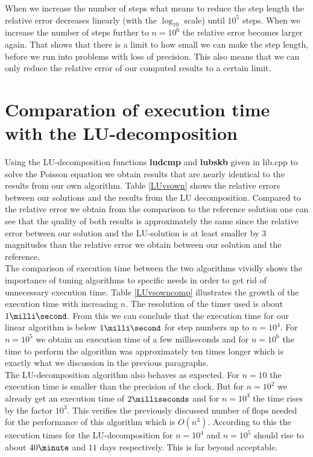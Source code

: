 \documentclass[11pt,a4wide]{article}
\begin{document}
When we increase the number of steps what means to reduce the step length the relative error decreases linearly (with the $\log_{10}$ scale) until $10^5$ steps. When we increase the number of steps further to $n=10^6$ the relative error becomes larger again. That shows that there is a limit to how small we can make the step length, before we run into problems with loss of precision. This also means that we can only reduce the relative error of our computed results to a certain limit.        
\section{Comparation of execution time with the LU-decomposition}
Using the LU-decomposition functions \textbf{ludcmp} and \textbf{lubskb}  given in lib.cpp to solve the Poisson equation we obtain results that are nearly identical to the results from our own algorithm. Table \ref{LUvsown} shows the relative errors between our solutions and the results from the LU decomposition. Compared to the relative error we obtain from the comparison to the reference solution one can see that the quality of both results is approximately the same since the relative error between our solution and the LU-solution is at least smaller by $3$ magnitudes than the relative error we obtain between our solution and the reference. \vspace{0.2cm}
\\ 
The comparison of execution time between the two algorithms vividly shows the importance of tuning algorithms to specific needs in order to get rid of unnecessary execution time. Table \ref{LUvsowncomp} illustrates the growth of the execution time with increasing $n$. The resolution of the timer used is about $1\milli\second$. From this we can conclude that the execution time for our linear algorithm is below $1\milli\second$ for step numbers up to $n=10^4$. For $n=10^5$ we obtain an execution time of a few milliseconds and for $n=10^6$ the time to perform the algorithm was approximately ten times longer which is exactly what we discussion in the previous paragraphs.
 \vspace{0.2cm}
\\
The LU-decomposition algorithm also behaves as expected.  For $n=10$ the execution time is smaller than the precision of the clock. But for $n=10^2$ we already get an execution time of $2\milliseconds$ and for $n=10^3$ the time rises by the factor $10^3$. This verifies the previously discussed number of flops needed for the performance of this algorithm which is $O(n^3)$. According to this the execution times for the LU-decomposition for $n=10^4$ and $n=10^5$ should rise to about $40\minute$ and $11$ days respectively. This is far beyond acceptable.
\end{document}
